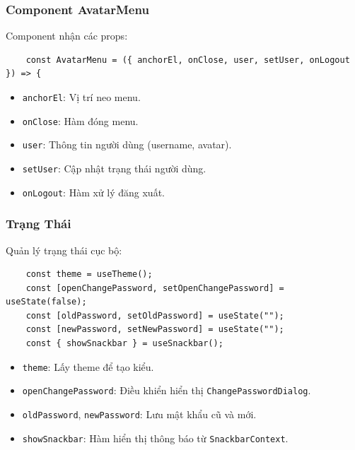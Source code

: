             \subsubsection{Component AvatarMenu}
                \hspace*{0.6cm}Component nhận các props:
                \begin{lstlisting}
    const AvatarMenu = ({ anchorEl, onClose, user, setUser, onLogout }) => {
                \end{lstlisting}
                \begin{itemize}
                    \item \texttt{anchorEl}: Vị trí neo menu.
                    \item \texttt{onClose}: Hàm đóng menu.
                    \item \texttt{user}: Thông tin người dùng (username, avatar).
                    \item \texttt{setUser}: Cập nhật trạng thái người dùng.
                    \item \texttt{onLogout}: Hàm xử lý đăng xuất.
                \end{itemize}

            \subsubsection{Trạng Thái}
                \hspace*{0.6cm}Quản lý trạng thái cục bộ:
                \begin{lstlisting}
    const theme = useTheme();
    const [openChangePassword, setOpenChangePassword] = useState(false);
    const [oldPassword, setOldPassword] = useState("");
    const [newPassword, setNewPassword] = useState("");
    const { showSnackbar } = useSnackbar();
                \end{lstlisting}
                \begin{itemize}
                    \item \texttt{theme}: Lấy theme để tạo kiểu.
                    \item \texttt{openChangePassword}: Điều khiển hiển thị \texttt{ChangePasswordDialog}.
                    \item \texttt{oldPassword}, \texttt{newPassword}: Lưu mật khẩu cũ và mới.
                    \item \texttt{showSnackbar}: Hàm hiển thị thông báo từ \texttt{SnackbarContext}.
                \end{itemize}

